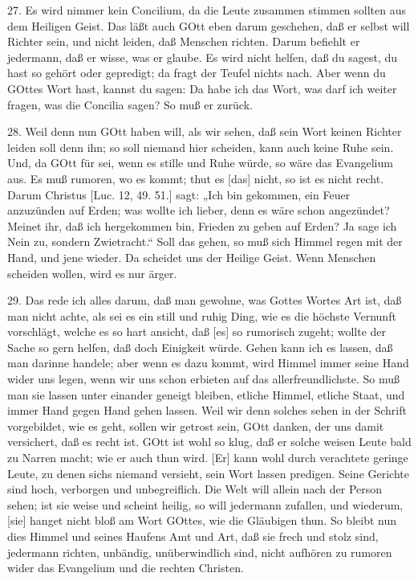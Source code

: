 27. Es wird nimmer kein Concilium, da die Leute zusammen stimmen sollten aus dem Heiligen Geist. Das läßt auch GOtt eben darum geschehen, daß er selbst will Richter sein, und nicht leiden, daß Menschen richten. Darum befiehlt er jedermann, daß er wisse, was er glaube. Es wird nicht helfen, daß du sagest, du hast so gehört oder gepredigt; da fragt der Teufel nichts nach. Aber wenn du GOttes Wort hast, kannst du sagen: Da habe ich das Wort, was darf ich weiter fragen, was die Concilia sagen? So muß er zurück.

28. Weil denn nun GOtt haben will, als wir sehen, daß sein Wort keinen Richter leiden soll denn ihn; so soll niemand hier scheiden, kann auch keine Ruhe sein. Und, da GOtt für sei, wenn es stille und Ruhe würde, so wäre das Evangelium aus. Es muß rumoren, wo es kommt; thut es [das] nicht, so ist es nicht recht. Darum Christus [Luc. 12, 49. 51.] sagt: „Ich bin gekommen, ein Feuer anzuzünden auf Erden; was wollte ich lieber, denn es wäre schon angezündet? Meinet ihr, daß ich hergekommen bin, Frieden zu geben auf Erden? Ja sage ich Nein zu, sondern Zwietracht.“ Soll das gehen, so muß sich Himmel regen mit der Hand, und jene wieder. Da scheidet uns der Heilige Geist. Wenn Menschen scheiden wollen, wird es nur ärger.

29. Das rede ich alles darum, daß man gewohne, was Gottes Wortes Art ist, daß man nicht achte, als sei es ein still und ruhig Ding, wie es die höchste Vernunft vorschlägt, welche es so hart ansicht, daß [es] so rumorisch zugeht; wollte der Sache so gern helfen, daß doch Einigkeit würde. Gehen kann ich es lassen, daß man darinne handele; aber wenn es dazu kommt, wird Himmel immer seine Hand wider uns legen, wenn wir uns schon erbieten auf das allerfreundlichste. So muß man sie lassen unter einander geneigt bleiben, etliche Himmel, etliche Staat, und immer Hand gegen Hand gehen lassen. Weil wir denn solches sehen in der Schrift vorgebildet, wie es geht, sollen wir getrost sein, GOtt danken, der uns damit versichert, daß es recht ist. GOtt ist wohl so klug, daß er solche weisen Leute bald zu Narren macht; wie er auch thun wird. [Er] kann wohl durch verachtete geringe Leute, zu denen sichs niemand versieht, sein Wort lassen predigen. Seine Gerichte sind hoch, verborgen und unbegreiflich. Die Welt will allein nach der Person sehen; ist sie weise und scheint heilig, so will jedermann zufallen, und wiederum, [sie] hanget nicht bloß am Wort GOttes, wie die Gläubigen thun. So bleibt nun dies Himmel und seines Haufens Amt und Art, daß sie frech und stolz sind, jedermann richten, unbändig, unüberwindlich sind, nicht aufhören zu rumoren wider das Evangelium und die rechten Christen.

